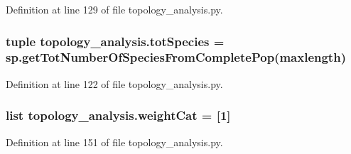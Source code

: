 Definition at line 129 of file topology\-\_\-analysis.\-py.

\hypertarget{a00157_ac657414359bc072005d43b2328119a7d}{
\subsubsection[{tot\-Species}]{\setlength{\rightskip}{0pt plus 5cm}tuple topology\-\_\-analysis.\-tot\-Species = sp.\-get\-Tot\-Number\-Of\-Species\-From\-Complete\-Pop(maxlength)}}\label{a00157_ac657414359bc072005d43b2328119a7d}


Definition at line 122 of file topology\-\_\-analysis.\-py.

\hypertarget{a00157_a67cf979bfd8cf26867524a1a788a5e63}{
\subsubsection[{weight\-Cat}]{\setlength{\rightskip}{0pt plus 5cm}list topology\-\_\-analysis.\-weight\-Cat = \mbox{[}1\mbox{]}}}\label{a00157_a67cf979bfd8cf26867524a1a788a5e63}


Definition at line 151 of file topology\-\_\-analysis.\-py.

